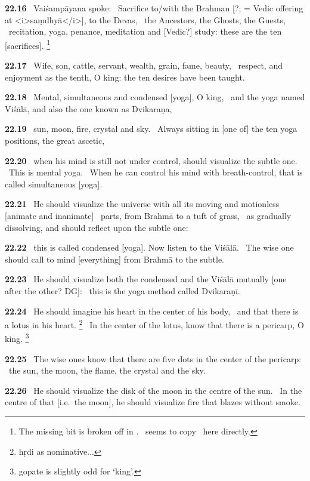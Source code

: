 \documentclass{article}
\begin{document}
\textbf{22.16}%
\ Vaiśampāyana spoke:%
\ Sacrifice to/with the Brahman [?; = Vedic offering at <i>saṃdhyā</i>], to the Devas,%
\                          the Ancestors, the Ghosts, the Guests,%
\ recitation, yoga, penance, meditation and [Vedic?] study: these are the ten [sacrifices].%
\footnote{The missing bit is broken off in \msNa. \msL\ seems to copy \msNa\ here directly. }%


\textbf{22.17}%
\ Wife, son, cattle, servant, wealth, grain, fame, beauty,%
\ respect, and enjoyment as the tenth, O king: the ten desires have been taught.%


\textbf{22.18}%
\ Mental, simultaneous and condensed [yoga], O king,%
\ and the yoga named Viśālā, and also the one known as Dvikaraṇa,%


\textbf{22.19}%
\ sun, moon, fire, crystal and sky.%
\ Always sitting in [one of] the ten yoga positions, the great ascetic,%


\textbf{22.20}%
\ when his mind is still not under control, should visualize the subtle one.%
\                                  This is mental yoga.%
\ When he can control his mind with breath-control, that is called simultaneous [yoga].%


\textbf{22.21}%
\ He should visualize the universe with all its moving and motionless [animate and inanimate]%
\                         parts, from Brahmā to a tuft of grass,%
\ as gradually dissolving, and should reflect upon the subtle one:%


\textbf{22.22}%
\ this is called condensed [yoga]. Now listen to the Viśālā.%
\ The wise one should call to mind [everything] from Brahmā to the subtle.%


\textbf{22.23}%
\ He should visualize both the condensed and the Viśālā mutually [one after the other? DG]:%
\ this is the yoga method called Dvikaraṇī.%


\textbf{22.24}%
\ He should imagine his heart in the center of his body,%
\                         and that there is a lotus in his heart.%
\footnote{hṛdi as nominative... }%
\ In the center of the lotus, know that there is a pericarp, O king.%
\footnote{gopate is slightly odd for `king'. }%


\textbf{22.25}%
\ The wise ones know that there are five dots in the center of the pericarp:%
\ the sun, the moon, the flame, the crystal and the sky.%


\textbf{22.26}%
\ He should visualize the disk of the moon in the centre of the sun.%
\ In the centre of that [i.e.\ the moon], he should visualize fire that blazes without smoke.%
\end{document}
